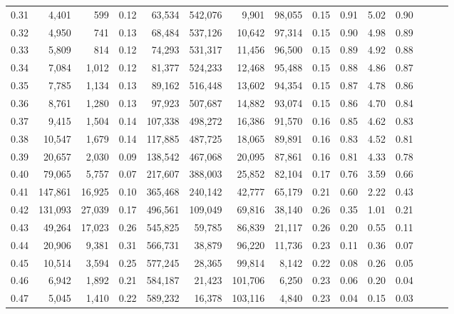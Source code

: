 \begin{tabular}{rrrrrrrrrrrrrrr}
0.31 &    4,401 &     599 &  0.12 &   63,534 &  542,076 &    9,901 &   98,055 &  0.15 &  0.91 &  5.02 &      0.90 \\
0.32 &    4,950 &     741 &  0.13 &   68,484 &  537,126 &   10,642 &   97,314 &  0.15 &  0.90 &  4.98 &      0.89 \\
0.33 &    5,809 &     814 &  0.12 &   74,293 &  531,317 &   11,456 &   96,500 &  0.15 &  0.89 &  4.92 &      0.88 \\
0.34 &    7,084 &   1,012 &  0.12 &   81,377 &  524,233 &   12,468 &   95,488 &  0.15 &  0.88 &  4.86 &      0.87 \\
0.35 &    7,785 &   1,134 &  0.13 &   89,162 &  516,448 &   13,602 &   94,354 &  0.15 &  0.87 &  4.78 &      0.86 \\
0.36 &    8,761 &   1,280 &  0.13 &   97,923 &  507,687 &   14,882 &   93,074 &  0.15 &  0.86 &  4.70 &      0.84 \\
0.37 &    9,415 &   1,504 &  0.14 &  107,338 &  498,272 &   16,386 &   91,570 &  0.16 &  0.85 &  4.62 &      0.83 \\
0.38 &   10,547 &   1,679 &  0.14 &  117,885 &  487,725 &   18,065 &   89,891 &  0.16 &  0.83 &  4.52 &      0.81 \\
0.39 &   20,657 &   2,030 &  0.09 &  138,542 &  467,068 &   20,095 &   87,861 &  0.16 &  0.81 &  4.33 &      0.78 \\
0.40 &   79,065 &   5,757 &  0.07 &  217,607 &  388,003 &   25,852 &   82,104 &  0.17 &  0.76 &  3.59 &      0.66 \\
0.41 &  147,861 &  16,925 &  0.10 &  365,468 &  240,142 &   42,777 &   65,179 &  0.21 &  0.60 &  2.22 &      0.43 \\
0.42 &  131,093 &  27,039 &  0.17 &  496,561 &  109,049 &   69,816 &   38,140 &  0.26 &  0.35 &  1.01 &      0.21 \\
0.43 &   49,264 &  17,023 &  0.26 &  545,825 &   59,785 &   86,839 &   21,117 &  0.26 &  0.20 &  0.55 &      0.11 \\
0.44 &   20,906 &   9,381 &  0.31 &  566,731 &   38,879 &   96,220 &   11,736 &  0.23 &  0.11 &  0.36 &      0.07 \\
0.45 &   10,514 &   3,594 &  0.25 &  577,245 &   28,365 &   99,814 &    8,142 &  0.22 &  0.08 &  0.26 &      0.05 \\
0.46 &    6,942 &   1,892 &  0.21 &  584,187 &   21,423 &  101,706 &    6,250 &  0.23 &  0.06 &  0.20 &      0.04 \\
0.47 &    5,045 &   1,410 &  0.22 &  589,232 &   16,378 &  103,116 &    4,840 &  0.23 &  0.04 &  0.15 &      0.03 \\

\end{tabular}
